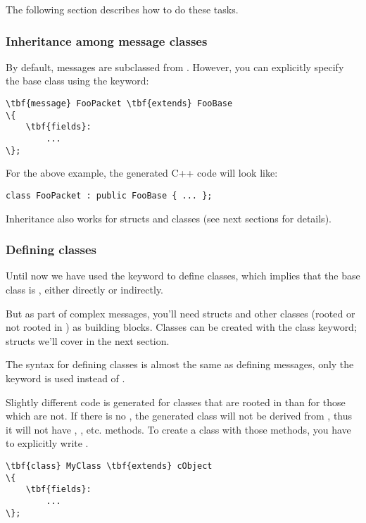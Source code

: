 The following section describes how to do these tasks.


\subsubsection{Inheritance among message classes}

By default, messages are subclassed from . However, you can
explicitly specify the base class using the  keyword:

\begin{Verbatim}[commandchars=\\\{\}]
\tbf{message} FooPacket \tbf{extends} FooBase
\{
    \tbf{fields}:
        ...
\};
\end{Verbatim}

For the above example, the generated C++ code will look like:

\begin{verbatim}
class FooPacket : public FooBase { ... };
\end{verbatim}

Inheritance also works for structs and classes (see next sections
for details).



\subsubsection{Defining classes}

Until now we have used the  keyword to define classes, which
implies that the base class is , either directly or indirectly.

But as part of complex messages, you'll need structs and other classes
(rooted or not rooted in ) as building blocks.
Classes can be created with the  class keyword;
structs we'll cover in the next section.

The syntax for defining classes is almost the same as defining messages,
only the  keyword is used instead of .

Slightly different code is generated for classes that are rooted in
 than for those which are not.
If there is no , the generated class will not be
derived from , thus it will not have ,
, etc. methods.
To create a class with those methods, you have to explicitly write
.

\begin{Verbatim}[commandchars=\\\{\}]
\tbf{class} MyClass \tbf{extends} cObject
\{
    \tbf{fields}:
        ...
\};
\end{Verbatim}



